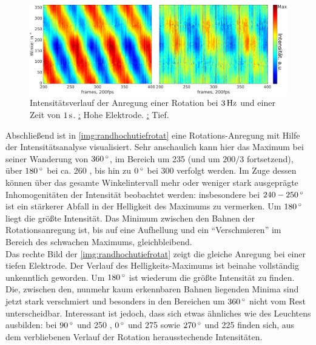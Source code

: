       \begin{figure}[!t]
        \centering
        \includegraphics[width=\textwidth]{figs/auswertung/plasmaglw/randrotathochutief3Hz1sekwink.png}
        \caption{Intensitätsverlauf der Anregung einer Rotation bei $\unit[3]{Hz}$ und einer Zeit von $\unit[1]{s}$. \underline{:} Hohe Elektrode. \underline{:} Tief.}
        \label{img:randhochutiefrotat}
      \end{figure}

    Abschließend ist in \autoref{img:randhochutiefrotat} eine Rotations-Anregung mit Hilfe der Intensitätsanalyse visualisiert. Sehr anschaulich kann hier das Maximum bei seiner Wanderung von $\unit[360]{\degree}$, im Bereich um  235 (und um $200/3$  fortsetzend), über $\unit[180]{\degree}$ bei ca.  260 , bis hin zu $\unit[0]{\degree}$ bei  300 verfolgt werden. Im Zuge dessen können über das gesamte Winkelintervall mehr oder weniger stark ausgeprägte Inhomogenitäten der Intensität beobachtet werden: insbesondere bei $\unit[240-250]{\degree}$ ist ein stärkerer Abfall in der Helligkeit des Maximums zu vermerken. Um $\unit[180]{\degree}$ liegt die größte Intensität. Das Minimum zwischen den Bahnen der Rotationsanregung ist, bis auf eine Aufhellung und ein "`Verschmieren"' im Bereich des schwachen Maximums, gleichbleibend.\\
    Das rechte Bild der \autoref{img:randhochutiefrotat} zeigt die gleiche Anregung bei einer tiefen Elektrode. Der Verlauf des Helligkeits-Maximums ist beinahe vollständig unkenntlich geworden. Um $\unit[180]{\degree}$ ist wiederum die größte Intensität zu finden. Die, zwischen den, nunmehr kaum erkennbaren Bahnen liegenden Minima sind jetzt stark verschmiert und besonders in den Bereichen um $\unit[360]{\degree}$ nicht vom Rest unterscheidbar. Interessant ist jedoch, dass sich etwas ähnliches wie  des Leuchtens ausbilden: bei $\unit[90]{\degree}$ und  250 , $\unit[0]{\degree}$ und   275 sowie $\unit[270]{\degree}$ und  225 finden sich, aus dem verbliebenen Verlauf der Rotation herausstechende Intensitäten. 

